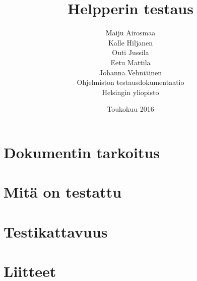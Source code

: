 \documentclass[a4paper,12pt, titlepage]{article}
\title{Helpperin testaus}
\author{ Maiju Airosmaa \\ Kalle Hiljanen \\
Outi Jussila \\ Eetu Mattila \\ Johanna Vehniäinen \\[1cm] Ohjelmiston testausdokumentaatio \\ Helsingin yliopisto}
\date{Toukokuu 2016}
\begin{document}
\maketitle

\tableofcontents

\section{Dokumentin tarkoitus}

\section{Mitä on testattu}

\section{Testikattavuus}

\section{Liitteet}
\end{document}

